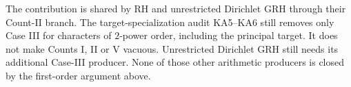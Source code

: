 The contribution is shared by RH and unrestricted
Dirichlet GRH through their Count-II branch.
The target-specialization audit KA5--KA6 still
removes only Case III for characters of
$2$-power order, including the principal target.
It does not make Counts I, II or V vacuous.
Unrestricted Dirichlet GRH still needs its
additional Case-III producer.  None of those
other arithmetic producers is closed by the
first-order argument above.
